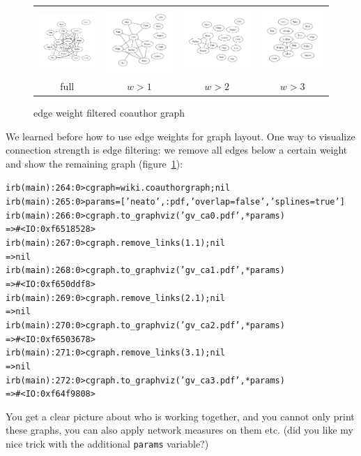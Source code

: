 \documentclass[a4paper]{scrartcl}
\newcounter{tcounter}
\newcommand{\tcount}{\makebox[0pt][r]{\tiny\thetcounter~}}
\newenvironment{typed}{\refstepcounter{tcounter}\bgroup\setlength{\topsep}{0pt}\renewcommand{\FrameCommand}[1]{\fcolorbox{black!30}{bgcolor}{##1}\tcount}\MakeFramed{\FrameRestore}\begin{alltt}\small}{\end{alltt}\endMakeFramed\egroup\par\aftergroup\noindent\aftergroup\ignorespaces}
\newcommand{\cmd}[1]{\texttt{\color{cmd}#1}}
\newcommand{\p}{\textcolor{prompt}}
\renewcommand{\c}{\textcolor{cmd}}
\begin{document}
\begin{figure}
  \begin{tabular}{@{}c@{}c@{}c@{}c@{}}
    \includegraphics[width=.25\linewidth]{gv_ca0} &
    \includegraphics[width=.25\linewidth]{gv_ca1} &
    \includegraphics[width=.25\linewidth]{gv_ca2} & 
    \includegraphics[width=.25\linewidth]{gv_ca3}\\
    full & $w>1$ & $w>2$ & $w>3$
  \end{tabular}
  \caption{edge weight filtered coauthor graph}
  \label{fig:ca-weightfilter}
\end{figure}

We learned before how to use edge weights for graph layout. One way to
visualize connection strength is edge filtering: we remove all edges
below a certain weight and show the remaining graph
(figure~\ref{fig:ca-weightfilter}):
\begin{typed}
\p{irb(main):264:0>} \c{cgraph = wiki.coauthorgraph; nil}
\p{irb(main):265:0>} \c{params = ['neato', :pdf, 'overlap=false', 'splines=true']}
\p{irb(main):266:0>} \c{cgraph.to_graphviz('gv_ca0.pdf', *params)}
=> #<IO:0xf6518528>
\p{irb(main):267:0>} \c{cgraph.remove_links(1.1); nil}
=> nil
\p{irb(main):268:0>} \c{cgraph.to_graphviz('gv_ca1.pdf', *params)}
=> #<IO:0xf650ddf8>
\p{irb(main):269:0>} \c{cgraph.remove_links(2.1); nil}
=> nil
\p{irb(main):270:0>} \c{cgraph.to_graphviz('gv_ca2.pdf', *params)}
=> #<IO:0xf6503678>
\p{irb(main):271:0>} \c{cgraph.remove_links(3.1); nil}
=> nil
\p{irb(main):272:0>} \c{cgraph.to_graphviz('gv_ca3.pdf', *params)}
=> #<IO:0xf64f9808>
\end{typed}
You get a clear picture about who is working together, and you cannot
only print these graphs, you can also apply network measures on them
etc. (did you like my nice trick with the additional \cmd{params} variable?)
\end{document}
